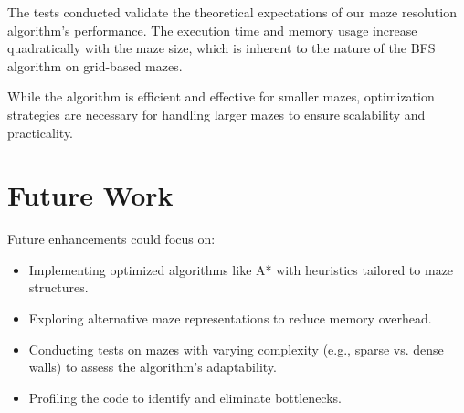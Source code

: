 \documentclass{article}
\begin{document}
The tests conducted validate the theoretical expectations of our maze resolution algorithm's performance. The execution time and memory usage increase quadratically with the maze size, which is inherent to the nature of the BFS algorithm on grid-based mazes.

While the algorithm is efficient and effective for smaller mazes, optimization strategies are necessary for handling larger mazes to ensure scalability and practicality.

\section*{Future Work}

Future enhancements could focus on:

\begin{itemize}
    \item Implementing optimized algorithms like A* with heuristics tailored to maze structures.
    \item Exploring alternative maze representations to reduce memory overhead.
    \item Conducting tests on mazes with varying complexity (e.g., sparse vs. dense walls) to assess the algorithm's adaptability.
    \item Profiling the code to identify and eliminate bottlenecks.
\end{itemize}
\end{document}
